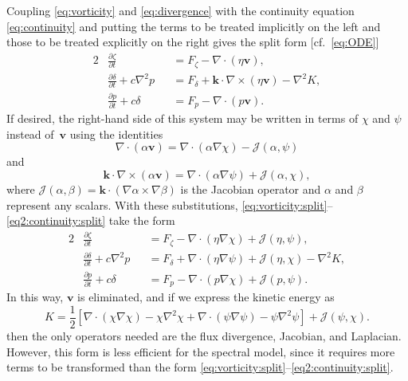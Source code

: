 \documentclass[12pt]{article}
\newcommand{\vecv}{\mathbf{v}}
\newcommand{\veck}{\mathbf{k}}
\newcommand{\Fphi}{F_\p}
\newcommand{\Fzeta}{F_{\zeta}}
\newcommand{\Fdelta}{F_{\delta}}
\newcommand{\p}{{p}}   %
\newcommand{\cross}{\times}
\newcommand{\del}{\nabla}
\newcommand{\laplacian}[1]{\del^2#1}
\newcommand{\fluxdiv}[2]{\del\cdot\left(#1\del#2\right)}
\newcommand{\jacobian}[2]{\mathcal{J}\left(#1,#2\right)}
\begin{document}
Coupling \eqref{eq:vorticity} and \eqref{eq:divergence} with the continuity
equation \eqref{eq:continuity} and putting the terms to be treated implicitly
on the left and those to be treated explicitly 
on the right gives the split form
[cf.~\eqref{eq:ODE}]
\begin{alignat}{2}
   &\frac{\partial \zeta}{\partial t} &&= \Fzeta - \del\cdot(\eta\vecv) ,
\label{eq:vorticity:split}
\\
   &\frac{\partial \delta}{\partial t} + c\del^2 \p &&= 
      \Fdelta + \veck\cdot\del\cross(\eta\vecv) - \del^2 K ,
\label{eq:divergence:split}
\\
   &\frac{\partial\p}{\partial t} + c\delta &&= \Fphi - \del\cdot(\p\vecv) .
\label{eq2:continuity:split}
\end{alignat}
If desired, the right-hand side of this system may be written in terms of 
$\chi$ and $\psi$ instead of~$\vecv$ using the identities
\begin{equation}
   \del\cdot(\alpha\vecv) = 
      \del\cdot(\alpha\del\chi) - \jacobian{\alpha}{\psi}
\label{eq:identity1}
\end{equation}
and
\begin{equation}
   \veck\cdot\del\cross(\alpha\vecv) = 
      \del\cdot(\alpha\del\psi) + \jacobian{\alpha}{\chi} ,
\label{eq:identity2}
\end{equation}
where $\jacobian{\alpha}{\beta}=\veck\cdot(\del\alpha\cross\del\beta)$ is the
Jacobian operator and $\alpha$ and $\beta$ represent any scalars. 
With these substitutions, 
\eqref{eq:vorticity:split}--\eqref{eq2:continuity:split} take the form
\begin{alignat}{2}
   &\frac{\partial \zeta}{\partial t} &&= 
      \Fzeta - \del\cdot(\eta\del\chi) + \jacobian{\eta}{\psi},
\label{eq:vorticity:split:psichi}
\\
   &\frac{\partial \delta}{\partial t} + c\del^2 \p &&= 
      \Fdelta + \del\cdot(\eta\del\psi) + \jacobian{\eta}{\chi} - \del^2 K ,
\label{eq:divergence:split:psichi}
\\
   &\frac{\partial\p}{\partial t} + c\delta &&= 
      \Fphi - \del\cdot(\p\del\chi) + \jacobian{\p}{\psi} .
\label{eq2:continuity:split:psichi}
\end{alignat}
In this way, $\vecv$ is eliminated, and if we express the kinetic energy as
\begin{equation}
   K = \frac12\left[ \fluxdiv{\chi}{\chi} - \chi\laplacian\chi
                   + \fluxdiv{\psi}{\psi} - \psi\laplacian\psi \right]
      + \jacobian{\psi}{\chi}.
\label{eq:K:psichi}
\end{equation}
then the only operators needed are the flux divergence, Jacobian, and
Laplacian.  However, this form is less efficient for the spectral model, since
it requires more terms to be transformed than the form
\eqref{eq:vorticity:split}--\eqref{eq2:continuity:split}.
\end{document}
